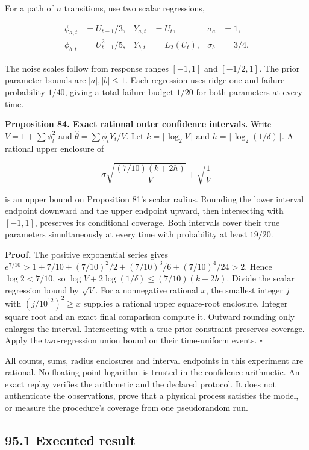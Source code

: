 For a path of \(n\) transitions, use two scalar regressions,

\[
\begin{aligned}
\phi_{a,t}&=U_{t-1}/3,&Y_{a,t}&=U_t,&\sigma_a&=1,\\
\phi_{b,t}&=U_{t-1}^2/5,&Y_{b,t}&=L_2(U_t),&\sigma_b&=3/4.
\end{aligned}
\]

The noise scales follow from response ranges \([-1,1]\) and
\([-1/2,1]\). The prior parameter bounds are \(|a|,|b|\leq1\). Each
regression uses ridge one and failure probability \(1/40\), giving a
total failure budget \(1/20\) for both parameters at every time.

\textbf{Proposition 84. Exact rational outer confidence intervals.}
Write \(V=1+\sum\phi_t^2\) and \(\widehat\theta=\sum\phi_tY_t/V\). Let
\(k=\lceil\log_2 V\rceil\) and \(h=\lceil\log_2(1/\delta)\rceil\). A
rational upper enclosure of

\[
\sigma\sqrt{\frac{(7/10)(k+2h)}{V}}+\sqrt{\frac1V}
\]

is an upper bound on Proposition 81's scalar radius. Rounding the lower
interval endpoint downward and the upper endpoint upward, then
intersecting with \([-1,1]\), preserves its conditional coverage. Both
intervals cover their true parameters simultaneously at every time with
probability at least \(19/20\).

\textbf{Proof.} The positive exponential series gives
\(e^{7/10}>1+7/10+(7/10)^2/2+(7/10)^3/6+(7/10)^4/24>2\). Hence
\(\log 2<7/10\), so \(\log V+2\log(1/\delta)\leq(7/10)(k+2h)\). Divide
the scalar regression bound by \(\sqrt V\). For a nonnegative rational
\(x\), the smallest integer \(j\) with \((j/10^{12})^2\geq x\) supplies
a rational upper square-root enclosure. Integer square root and an exact
final comparison compute it. Outward rounding only enlarges the
interval. Intersecting with a true prior constraint preserves coverage.
Apply the two-regression union bound on their time-uniform events.
\(\square\)

All counts, sums, radius enclosures and interval endpoints in this
experiment are rational. No floating-point logarithm is trusted in the
confidence arithmetic. An exact replay verifies the arithmetic and the
declared protocol. It does not authenticate the observations, prove that
a physical process satisfies the model, or measure the procedure's
coverage from one pseudorandom run.

\subsection{95.1 Executed result}\label{LSM:executed-result}

